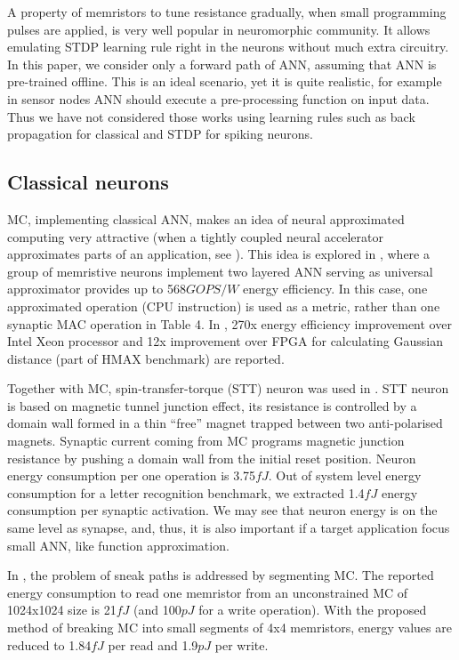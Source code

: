 \documentclass[conference, compsoc]{IEEEtran}
\begin{document}
A property of memristors to tune resistance gradually, when small programming pulses are applied, is very well popular in neuromorphic community. It allows emulating STDP learning rule right in the neurons without much extra circuitry. In this paper, we consider only a forward path of ANN, assuming that ANN is pre-trained offline. This is an ideal scenario, yet it is quite realistic, for example in sensor nodes ANN should  execute a pre-processing function on input data. Thus we have not considered  those works using learning rules such as back propagation for classical and STDP for spiking neurons.

\subsection{Classical neurons}
MC, implementing classical ANN, makes an idea of neural approximated computing very attractive (when a tightly coupled neural accelerator approximates parts of an application, see \cite{Esmaeilzadeh:Approximate,Esmaeilzadeh:Approximate_analog}). This idea is explored in \cite{Memristor_approximated,RRAM_approximated}, where a group of memristive neurons implement two layered ANN serving as universal approximator provides up to 568$ GOPS/W $ energy efficiency. In this case, one approximated operation (CPU instruction) is used as a metric, rather than one synaptic MAC operation in Table 4. In \cite{Memristor_approximated}, 270x energy efficiency improvement over Intel Xeon processor and 12x improvement over FPGA for calculating Gaussian distance (part of HMAX benchmark) are reported.

Together with MC, spin-transfer-torque (STT) neuron was used in \cite{STT_SNN}. STT neuron is based on magnetic tunnel junction effect, its resistance is controlled by a domain wall formed in a thin “free” magnet trapped between two anti-polarised magnets. Synaptic current coming from MC programs magnetic junction resistance by pushing a domain wall from the initial reset position. Neuron energy consumption per one operation is 3.75$ fJ $. Out of system level energy consumption for a letter recognition benchmark, we extracted 1.4$ fJ $ energy consumption per synaptic activation. We may see that neuron energy is on the same level as synapse, and, thus, it is also important if a target application focus small ANN, like function approximation.

In \cite{Segmented_memristor}, the problem of sneak paths is addressed by segmenting MC. The reported energy consumption to read one memristor from an unconstrained MC of 1024x1024 size is 21$ fJ $ (and 100$ pJ $ for a write operation). With the proposed method of breaking MC into small segments of 4x4 memristors, energy values are reduced to 1.84$ fJ $ per read and 1.9$ pJ $ per write.
\end{document}
